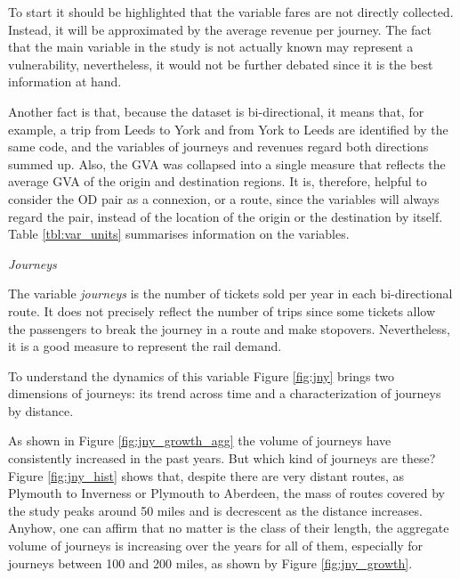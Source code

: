To start it should be highlighted that the variable fares are not directly collected. Instead, it will be approximated by the average revenue per journey. The fact that the main variable in the study is not actually known may represent a vulnerability, nevertheless, it would not be further debated since it is the best information at hand.

Another fact is that, because the dataset is bi-directional, it means that, for example, a trip from Leeds to York and from York to Leeds are identified by the same code, and the variables of journeys and revenues regard both directions summed up. Also, the GVA was collapsed into a single measure that reflects the average GVA of the origin and destination regions. It is, therefore, helpful to consider the OD pair as a connexion, or a route, since the variables will always regard the pair, instead of the location of the origin or the destination by itself. Table \ref{tbl:var_units} summarises information on the variables.



\textit{Journeys}

The variable \textit{journeys} is the number of tickets sold per year in each bi-directional route. It does not precisely reflect the number of trips since some tickets allow the passengers to break the journey in a route and make stopovers. Nevertheless, it is a good measure to represent the rail demand. 

To understand the dynamics of this variable Figure \ref{fig:jny} brings two dimensions of journeys: its trend across time and a characterization of journeys by distance.

As shown in Figure \ref{fig:jny_growth_agg} the volume of journeys have consistently increased in the past years. But which kind of journeys are these? Figure \ref{fig:jny_hist} shows that, despite there are very distant routes, as Plymouth to Inverness or Plymouth to Aberdeen, the mass of routes covered by the study peaks around 50 miles and is decrescent as the distance increases. Anyhow, one can affirm that no matter is the class of their length, the aggregate volume of journeys is increasing over the years for all of them, especially for journeys between 100 and 200 miles, as shown by Figure \ref{fig:jny_growth}. 

